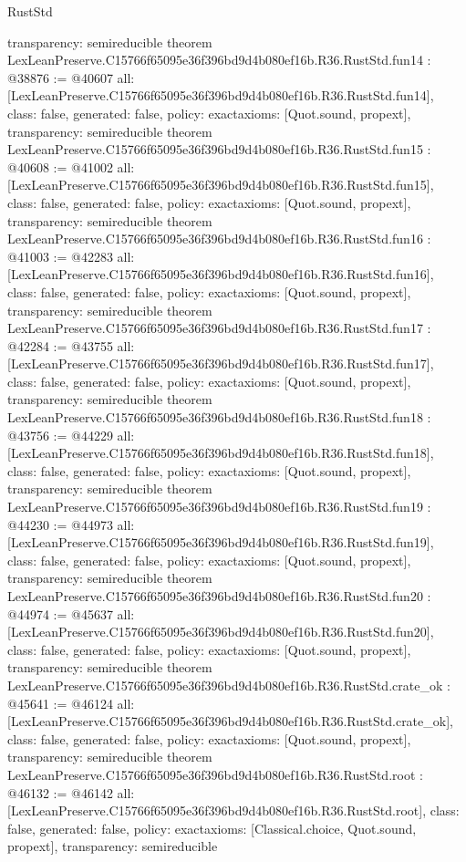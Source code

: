\begin{lexlean}{RustStd}
\begin{coremodule}
{  transparency: semireducible
}
theorem LexLeanPreserve.C15766f65095e36f396bd9d4b080ef16b.R36.RustStd.fun14 : @38876 := @40607 {
  all: [LexLeanPreserve.C15766f65095e36f396bd9d4b080ef16b.R36.RustStd.fun14],
  class: false,
  generated: false,
  policy: exact{axioms: [Quot.sound, propext]},
  transparency: semireducible
}
theorem LexLeanPreserve.C15766f65095e36f396bd9d4b080ef16b.R36.RustStd.fun15 : @40608 := @41002 {
  all: [LexLeanPreserve.C15766f65095e36f396bd9d4b080ef16b.R36.RustStd.fun15],
  class: false,
  generated: false,
  policy: exact{axioms: [Quot.sound, propext]},
  transparency: semireducible
}
theorem LexLeanPreserve.C15766f65095e36f396bd9d4b080ef16b.R36.RustStd.fun16 : @41003 := @42283 {
  all: [LexLeanPreserve.C15766f65095e36f396bd9d4b080ef16b.R36.RustStd.fun16],
  class: false,
  generated: false,
  policy: exact{axioms: [Quot.sound, propext]},
  transparency: semireducible
}
theorem LexLeanPreserve.C15766f65095e36f396bd9d4b080ef16b.R36.RustStd.fun17 : @42284 := @43755 {
  all: [LexLeanPreserve.C15766f65095e36f396bd9d4b080ef16b.R36.RustStd.fun17],
  class: false,
  generated: false,
  policy: exact{axioms: [Quot.sound, propext]},
  transparency: semireducible
}
theorem LexLeanPreserve.C15766f65095e36f396bd9d4b080ef16b.R36.RustStd.fun18 : @43756 := @44229 {
  all: [LexLeanPreserve.C15766f65095e36f396bd9d4b080ef16b.R36.RustStd.fun18],
  class: false,
  generated: false,
  policy: exact{axioms: [Quot.sound, propext]},
  transparency: semireducible
}
theorem LexLeanPreserve.C15766f65095e36f396bd9d4b080ef16b.R36.RustStd.fun19 : @44230 := @44973 {
  all: [LexLeanPreserve.C15766f65095e36f396bd9d4b080ef16b.R36.RustStd.fun19],
  class: false,
  generated: false,
  policy: exact{axioms: [Quot.sound, propext]},
  transparency: semireducible
}
theorem LexLeanPreserve.C15766f65095e36f396bd9d4b080ef16b.R36.RustStd.fun20 : @44974 := @45637 {
  all: [LexLeanPreserve.C15766f65095e36f396bd9d4b080ef16b.R36.RustStd.fun20],
  class: false,
  generated: false,
  policy: exact{axioms: [Quot.sound, propext]},
  transparency: semireducible
}
theorem LexLeanPreserve.C15766f65095e36f396bd9d4b080ef16b.R36.RustStd.crate_ok : @45641 := @46124 {
  all: [LexLeanPreserve.C15766f65095e36f396bd9d4b080ef16b.R36.RustStd.crate_ok],
  class: false,
  generated: false,
  policy: exact{axioms: [Quot.sound, propext]},
  transparency: semireducible
}
theorem LexLeanPreserve.C15766f65095e36f396bd9d4b080ef16b.R36.RustStd.root : @46132 := @46142 {
  all: [LexLeanPreserve.C15766f65095e36f396bd9d4b080ef16b.R36.RustStd.root],
  class: false,
  generated: false,
  policy: exact{axioms: [Classical.choice, Quot.sound, propext]},
  transparency: semireducible
}


\end{coremodule}
\end{lexlean}

